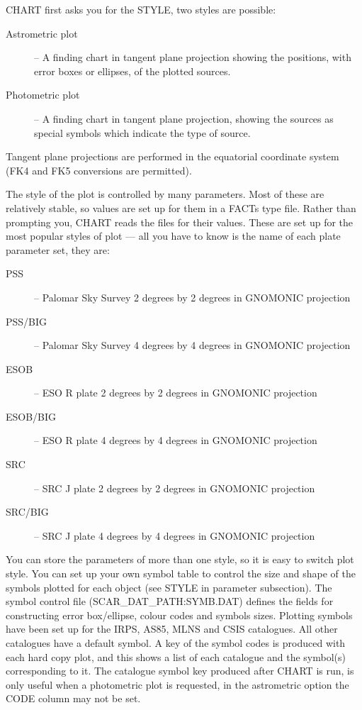 CHART first asks you for the STYLE, two styles are possible:
\begin{description}
\item [Astrometric plot] -- A finding chart in tangent plane projection showing
the positions, with error boxes or ellipses, of the plotted sources.
\item [Photometric plot] -- A finding chart in tangent plane projection, showing
the sources as special symbols which indicate the type of source.
\end{description}
Tangent plane projections are performed in the equatorial coordinate system
(FK4 and FK5 conversions are permitted).

The style of the plot is controlled by many parameters.
Most of these are relatively stable, so values are set up for them in a FACTs
type file.
Rather than prompting you, CHART reads the files for their values.
These are set up for the most popular styles of plot --- all you have to know
is the name of each plate parameter set, they are:
\begin{description}
\begin{description}
\item [PSS] -- Palomar Sky Survey 2 degrees by 2 degrees in GNOMONIC projection
\item [PSS/BIG] -- Palomar Sky Survey 4 degrees by 4 degrees in GNOMONIC 
  projection
\item [ESOB] -- ESO R plate 2 degrees by 2 degrees in GNOMONIC projection
\item [ESOB/BIG] -- ESO R plate 4 degrees by 4 degrees in GNOMONIC projection
\item [SRC] -- SRC J plate 2 degrees by 2 degrees in GNOMONIC projection
\item [SRC/BIG] -- SRC J plate 4 degrees by 4 degrees in GNOMONIC projection
\end{description}
\end{description}
You can store the parameters of more than one style, so it is easy to switch
plot style.
You can set up your own symbol table to control the size and shape of the
symbols plotted for each object (see STYLE in parameter subsection).
The symbol control file (SCAR\_DAT\_PATH:SYMB.DAT) defines the fields for 
constructing error box/ellipse, colour codes and symbols sizes.
Plotting symbols have been set up for the IRPS, AS85, MLNS and CSIS
catalogues. 
All other catalogues have a default symbol.
A key of the symbol codes is produced with each hard copy plot, and this shows
a list of each catalogue and the symbol(s) corresponding to it.
The catalogue symbol key produced after CHART is run, is only useful when a
photometric plot is requested, in the astrometric option the CODE
column may not be set.
 

